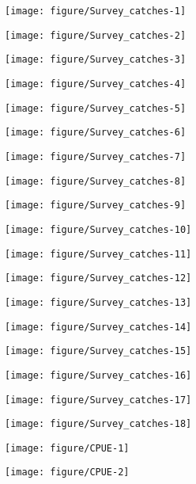 \documentclass[12pt]{article}\usepackage[]{graphicx}\usepackage[]{color}
\newenvironment{knitrout}{}{} %
\begin{document}
\begin{landscape}

\begin{knitrout}\footnotesize
{}\color{fgcolor}
\texttt{[image: figure/Survey\_catches-1]} 

\texttt{[image: figure/Survey\_catches-2]} 

\texttt{[image: figure/Survey\_catches-3]} 

\texttt{[image: figure/Survey\_catches-4]} 

\texttt{[image: figure/Survey\_catches-5]} 

\texttt{[image: figure/Survey\_catches-6]} 

\texttt{[image: figure/Survey\_catches-7]} 

\texttt{[image: figure/Survey\_catches-8]} 

\texttt{[image: figure/Survey\_catches-9]} 

\texttt{[image: figure/Survey\_catches-10]} 

\texttt{[image: figure/Survey\_catches-11]} 

\texttt{[image: figure/Survey\_catches-12]} 

\texttt{[image: figure/Survey\_catches-13]} 

\texttt{[image: figure/Survey\_catches-14]} 

\texttt{[image: figure/Survey\_catches-15]} 

\texttt{[image: figure/Survey\_catches-16]} 

\texttt{[image: figure/Survey\_catches-17]} 

\texttt{[image: figure/Survey\_catches-18]} 

\end{knitrout}

\begin{knitrout}\footnotesize
{}\color{fgcolor}
\texttt{[image: figure/CPUE-1]} 

\texttt{[image: figure/CPUE-2]} 

\end{knitrout}

\end{landscape}
\end{document}
